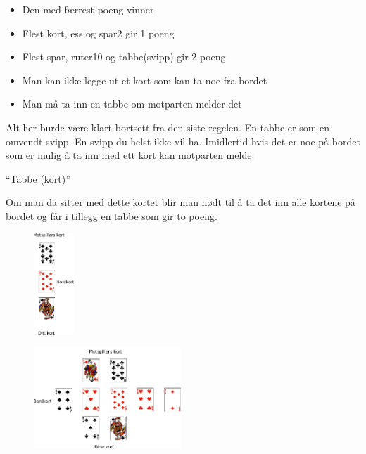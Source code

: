\begin{itemize}
	\item Den med færrest poeng vinner
	\item Flest kort, ess  og spar2  gir 1 poeng
	\item Flest spar, ruter10 og tabbe(svipp) gir 2 poeng
	\item Man kan ikke legge ut et kort som kan ta noe fra bordet
	\item Man må ta inn en tabbe om motparten melder det
\end{itemize}

Alt her burde være klart bortsett fra den siste regelen. En tabbe er
som en omvendt svipp. En svipp du helst ikke vil ha. Imidlertid hvis
det er noe på bordet som er mulig å ta inn med ett kort kan motparten
melde:
\begin{dialogue}
	\item ``Tabbe (kort)''
\end{dialogue}
Om man da sitter med dette kortet blir man nødt til å ta det inn alle
kortene på bordet og får i tillegg en tabbe som gir to poeng. 

\begin{figure}
\centering
\begin{minipage}{.3\paperwidth}
  \centering
  \includegraphics[height=1.5in]{tabbenkel}
  \label{fig:test1}
\end{minipage}%
\begin{minipage}{.6\textwidth}
  \centering
  \includegraphics[height=1.5in]{avanserttabbe}
  \label{fig:test2}
\end{minipage}
\end{figure}



